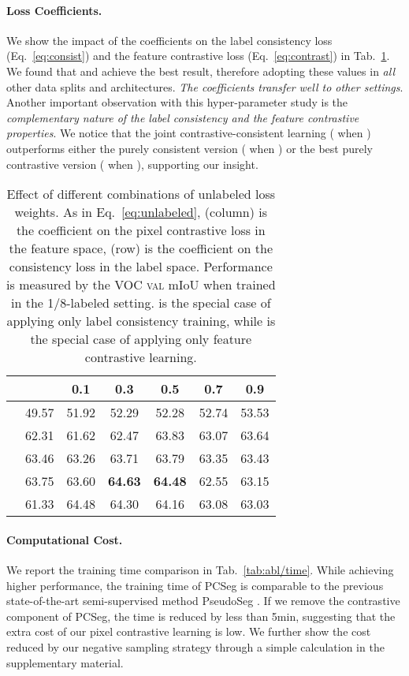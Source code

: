 \paragraph{Loss Coefficients.}
We show the impact of the coefficients on the label consistency loss (Eq.~\ref{eq:consist}) and the feature contrastive loss (Eq.~\ref{eq:contrast}) in Tab.~\ref{tab:abl/coef}. We found that  and  achieve the best result, therefore adopting these values in \emph{all} other data splits and architectures. {\em The coefficients transfer well to other settings}.
Another important observation with this hyper-parameter study is the {\em complementary nature of the label consistency and the feature contrastive properties}. We notice that the joint contrastive-consistent learning ( when ) outperforms either the purely consistent version ( when ) or the best purely contrastive version ( when ), supporting our insight.

\begin{table}[tb]
    \footnotesize
    \centering
    \caption{Effect of different combinations of unlabeled loss weights. As in Eq.~\ref{eq:unlabeled},  (column) is the coefficient on the pixel contrastive loss in the feature space,  (row) is the coefficient on the consistency loss in the label space. Performance is measured by the VOC \textsc{val} mIoU when trained in the 1/8-labeled setting.  is the special case of applying only label consistency training, while  is the special case of applying only feature contrastive learning.}
    \label{tab:abl/coef}
    \setlength{\tabcolsep}{6.5pt}
    \begin{tabular}{lcccccc}
    \toprule
      &  & 0.1 & 0.3 & 0.5 & 0.7 & 0.9  \\
    \midrule
     & 49.57 & 51.92 & 52.29 & 52.28 & 52.74 & 53.53 \\
     & 62.31 & 61.62 & 62.47 & 63.83 & 63.07 & 63.64 \\
     & 63.46 & 63.26 & 63.71 & 63.79 & 63.35 & 63.43 \\
     & 63.75 & 63.60 & \textbf{64.63} & \textbf{64.48} & 62.55 & 63.15 \\
     & 61.33 & 64.48 & 64.30 & 64.16 & 63.08 & 63.03 \\
    \bottomrule
    \end{tabular}
    \vspace{-5pt}
\end{table}


\paragraph{Computational Cost.}
We report the training time comparison in Tab.~\ref{tab:abl/time}. While achieving higher performance, the training time of PCSeg is comparable to the previous state-of-the-art semi-supervised method PseudoSeg \cite{zou2020pseudoseg}. If we remove the contrastive component of PCSeg, the time is reduced by less than 5min, suggesting that the extra cost of our pixel contrastive learning is low.
We further show the cost reduced by our negative sampling strategy through a simple calculation in the supplementary material.


